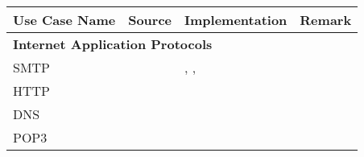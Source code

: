 

\begin{table}
\begin{center}
\begin{tabular}{|l|l|l|l|}
	\hline
	Use Case Name & Source & Implementation & Remark
	\\

	\hline
	\hline
	\multicolumn{4}{|l|}{ \textbf{Internet Application Protocols}}
	\\
	\hline
	SMTP & \cite{RFC} & \JavaAPI, \TypeState, \Links & 
	\\
	HTTP & \cite{RFC} & \JavaAPI & 
	\\
	DNS & \cite{RFC} & \Erlang &
	\\
	POP3 & \cite{RFC} & \TypeState & 
	\\


\end{tabular}
\end{center}
\end{table}
